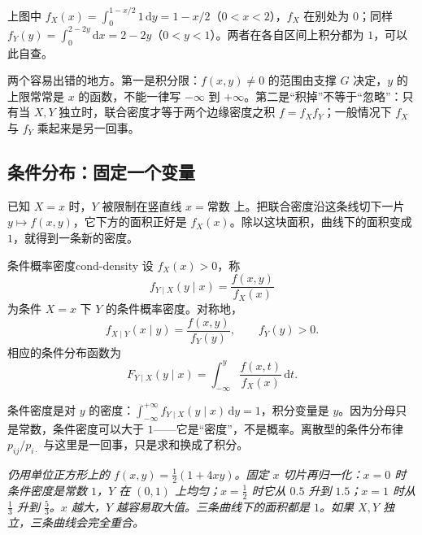 上图中 $f_X(x)=\int_0^{1-x/2}1\,\mathrm dy=1-x/2$（$0<x<2$），$f_X$ 在别处为 $0$；同样 $f_Y(y)=\int_0^{2-2y}\mathrm dx=2-2y$（$0<y<1$）。两者在各自区间上积分都为 $1$，可以此自查。

两个容易出错的地方。第一是积分限：$f(x,y)\ne 0$ 的范围由支撑 $G$ 决定，$y$ 的上限常常是 $x$ 的函数，不能一律写 $-\infty$ 到 $+\infty$。第二是“积掉”不等于“忽略”：只有当 $X,Y$ 独立时，联合密度才等于两个边缘密度之积 $f=f_Xf_Y$；一般情况下 $f_X$ 与 $f_Y$ 乘起来是另一回事。

\subsection{条件分布：固定一个变量}

已知 $X=x$ 时，$Y$ 被限制在竖直线 $x=\text{常数}$ 上。把联合密度沿这条线切下一片 $y\mapsto f(x,y)$，它下方的面积正好是 $f_X(x)$。除以这块面积，曲线下的面积变成 $1$，就得到一条新的密度。

\begin{mydef}{条件概率密度}{cond-density}
设 $f_X(x)>0$，称
\[
f_{Y\mid X}(y\mid x)=\frac{f(x,y)}{f_X(x)}
\]
为条件 $X=x$ 下 $Y$ 的条件概率密度。对称地，
\[
f_{X\mid Y}(x\mid y)=\frac{f(x,y)}{f_Y(y)},\qquad f_Y(y)>0 .
\]
相应的条件分布函数为
\[
F_{Y\mid X}(y\mid x)=\int_{-\infty}^{y}\frac{f(x,t)}{f_X(x)}\,\mathrm dt .
\]
\end{mydef}

条件密度是对 $y$ 的密度：$\int_{-\infty}^{+\infty}f_{Y\mid X}(y\mid x)\,\mathrm dy=1$，积分变量是 $y$。因为分母只是常数，条件密度可以大于 $1$——它是“密度”，不是概率。离散型的条件分布律 $p_{ij}/p_{i\cdot}$ 与这里是一回事，只是求和换成了积分。

\begin{center}
\par\vspace{2pt}
{\footnotesize\itshape 仍用单位正方形上的 $f(x,y)=\frac12(1+4xy)$。固定 $x$ 切片再归一化：$x=0$ 时条件密度是常数 $1$，$Y$ 在 $(0,1)$ 上均匀；$x=\frac12$ 时它从 $0.5$ 升到 $1.5$；$x=1$ 时从 $\frac13$ 升到 $\frac53$。$x$ 越大，$Y$ 越容易取大值。三条曲线下的面积都是 $1$。如果 $X,Y$ 独立，三条曲线会完全重合。}
\end{center}

